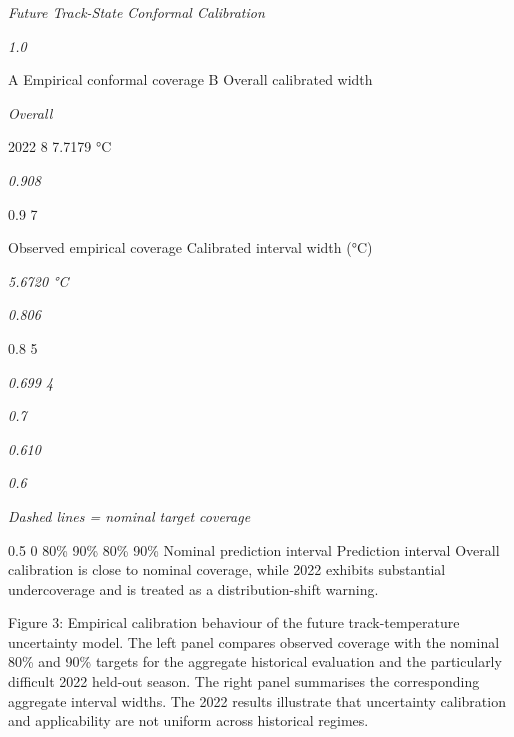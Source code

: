 \begin{center}\textit{Future Track-State Conformal Calibration}\end{center}

\begin{center}\textit{1.0}\end{center}

A Empirical conformal coverage B Overall calibrated width

\begin{center}\textit{Overall}\end{center}

2022 8 7.7179 °C

\begin{center}\textit{0.908}\end{center}

0.9 7

Observed empirical coverage Calibrated interval width (°C)

\begin{center}\textit{5.6720 °C}\end{center}

\begin{center}\textit{0.806}\end{center}

0.8 5

\begin{center}\textit{0.699                                                      4}\end{center}

\begin{center}\textit{0.7}\end{center}

\begin{center}\textit{0.610}\end{center}

\begin{center}\textit{0.6}\end{center}

\begin{center}\textit{Dashed lines = nominal target coverage}\end{center}

0.5 0 80\% 90\% 80\% 90\% Nominal prediction interval Prediction interval Overall calibration is close to nominal coverage, while 2022 exhibits substantial undercoverage and is treated as a distribution-shift warning.

Figure 3: Empirical calibration behaviour of the future track-temperature uncertainty model. The left panel compares observed coverage with the nominal 80\% and 90\% targets for the aggregate historical evaluation and the particularly difficult 2022 held-out season. The right panel summarises the corresponding aggregate interval widths. The 2022 results illustrate that uncertainty calibration and applicability are not uniform across historical regimes.


